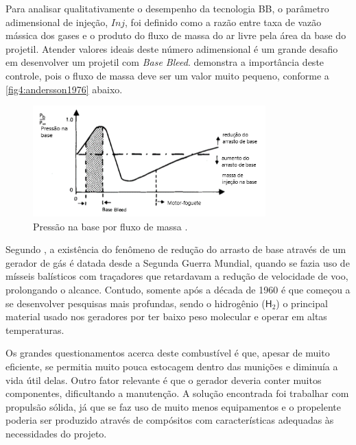 Para analisar qualitativamente o desempenho da tecnologia BB, o parâmetro adimensional de injeção, $Inj$, foi definido como a razão entre taxa de vazão mássica dos gases e o produto do fluxo de massa do ar livre pela área da base do projetil. Atender valores ideais deste número adimensional é um grande desafio em desenvolver um projetil com \textit{Base Bleed}. \citeauthor{Andersson1976} demonstra a importância deste controle, pois o fluxo de massa deve ser um valor muito pequeno, conforme a \autoref{fig4:andersson1976} abaixo.

\begin{figure}[!ht]
	\centering
	\includegraphics[width=0.8\textwidth]{foto04-grafico-andersson1976.png}
	\caption[Pressão na base por fluxo de massa.]{Pressão na base por fluxo de massa \cite{Andersson1976}.}
	\label{fig4:andersson1976}
\end{figure}

Segundo \citeauthor{Jelic2016Aug}, a existência do fenômeno de redução do arrasto de base através de um gerador de gás é datada desde a Segunda Guerra Mundial, quando se fazia uso de mísseis balísticos com traçadores que retardavam a redução de velocidade de voo, prolongando o alcance. Contudo, somente após a década de 1960 é que começou a se desenvolver pesquisas mais profundas, sendo o hidrogênio ($\textsf{H}_{2}$) o principal material usado nos geradores por ter baixo peso molecular e operar em altas temperaturas.

Os grandes questionamentos acerca deste combustível é que, apesar de muito eficiente, se permitia muito pouca estocagem dentro das munições e diminuía a vida útil delas. Outro fator relevante é que o gerador deveria conter muitos componentes, dificultando a manutenção. A solução encontrada foi trabalhar com propulsão sólida, já que se faz uso de muito menos equipamentos e o propelente poderia ser produzido através de compósitos com características adequadas às necessidades do projeto.

